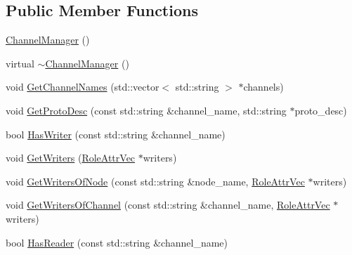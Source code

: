 \subsection*{Public Member Functions}
\begin{DoxyCompactItemize}
\item 
\hyperlink{classapollo_1_1cyber_1_1service__discovery_1_1ChannelManager_af4e4908c4172f7ff1703fea322611137}{Channel\-Manager} ()
\item 
virtual \hyperlink{classapollo_1_1cyber_1_1service__discovery_1_1ChannelManager_a32fb19451ed63f5bb92b4b2beb4eddcf}{$\sim$\-Channel\-Manager} ()
\item 
void \hyperlink{classapollo_1_1cyber_1_1service__discovery_1_1ChannelManager_aebc9f5fa682a8eba522a93ccebed3811}{Get\-Channel\-Names} (std\-::vector$<$ std\-::string $>$ $\ast$channels)
\item 
void \hyperlink{classapollo_1_1cyber_1_1service__discovery_1_1ChannelManager_a2259a9d33b8391ffb2ec307f6c442bc8}{Get\-Proto\-Desc} (const std\-::string \&channel\-\_\-name, std\-::string $\ast$proto\-\_\-desc)
\item 
bool \hyperlink{classapollo_1_1cyber_1_1service__discovery_1_1ChannelManager_a2d481f65124c1cdb70b66b81055f667f}{Has\-Writer} (const std\-::string \&channel\-\_\-name)
\item 
void \hyperlink{classapollo_1_1cyber_1_1service__discovery_1_1ChannelManager_ada1e428556994da13575932c6feee98b}{Get\-Writers} (\hyperlink{classapollo_1_1cyber_1_1service__discovery_1_1ChannelManager_a3690fc3677abdb994d1de9b996f66cf6}{Role\-Attr\-Vec} $\ast$writers)
\item 
void \hyperlink{classapollo_1_1cyber_1_1service__discovery_1_1ChannelManager_a928e0afa8478cb244f3dd5d872694f38}{Get\-Writers\-Of\-Node} (const std\-::string \&node\-\_\-name, \hyperlink{classapollo_1_1cyber_1_1service__discovery_1_1ChannelManager_a3690fc3677abdb994d1de9b996f66cf6}{Role\-Attr\-Vec} $\ast$writers)
\item 
void \hyperlink{classapollo_1_1cyber_1_1service__discovery_1_1ChannelManager_a35bfdd2076a4789c23e9add4c868b5e7}{Get\-Writers\-Of\-Channel} (const std\-::string \&channel\-\_\-name, \hyperlink{classapollo_1_1cyber_1_1service__discovery_1_1ChannelManager_a3690fc3677abdb994d1de9b996f66cf6}{Role\-Attr\-Vec} $\ast$writers)
\item 
bool \hyperlink{classapollo_1_1cyber_1_1service__discovery_1_1ChannelManager_aa7e63842773a5f7d2b92bd856dc553dd}{Has\-Reader} (const std\-::string \&channel\-\_\-name)
\item 

\end{DoxyCompactItemize}
